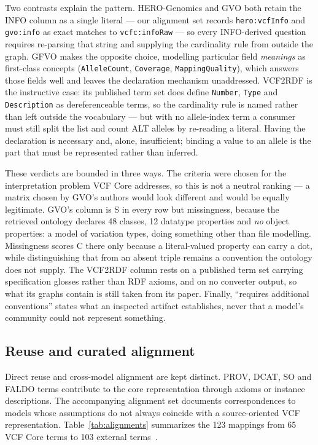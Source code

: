 \documentclass{ceurart}
\newcommand{\term}[1]{\texttt{#1}}
\begin{document}
Two contrasts explain the pattern. 
HERO-Genomics and GVO both retain the INFO column as a single literal --- our alignment set records \term{hero:vcfInfo} and \term{gvo:info} as exact matches to \term{vcfc:infoRaw} --- so every INFO-derived question requires re-parsing that string and supplying the cardinality rule from outside the graph. 
GFVO makes the opposite choice, modelling particular field \emph{meanings} as first-class concepts (\term{AlleleCount}, \term{Coverage}, \term{MappingQuality}), which answers those fields well and leaves the declaration mechanism unaddressed. 
VCF2RDF is the instructive case: its published term set does define \term{Number}, \term{Type} and \term{Description} as dereferenceable terms, so the cardinality rule is named rather than left outside the vocabulary --- but with no allele-index term a consumer must still split the list and count ALT alleles by re-reading a literal. 
Having the declaration is necessary and, alone, insufficient; binding a value to an allele is the part that must be represented rather than inferred.

These verdicts are bounded in three ways. 
The criteria were chosen for the interpretation problem VCF Core addresses, so this is not a neutral ranking --- a matrix chosen by GVO's authors would look different and would be equally legitimate. 
GVO's column is S in every row but missingness, because the retrieved ontology declares 48 classes, 12 datatype properties and \emph{no} object properties: a model of variation types, doing something other than file modelling. 
Missingness scores C there only because a literal-valued property can carry a dot, while distinguishing that from an absent triple remains a convention the ontology does not supply. 
The VCF2RDF column rests on a published term set carrying specification glosses rather than RDF axioms, and on no converter output, so what its graphs contain is still taken from its paper. 
Finally, ``requires additional conventions'' states what an inspected artifact establishes, never that a model's community could not represent something.

\subsection{Reuse and curated alignment}

Direct reuse and cross-model alignment are kept distinct. 
PROV, DCAT, SO and FALDO terms contribute to the core representation through axioms or instance descriptions. 
The accompanying alignment set documents correspondences to models whose assumptions do not always coincide with a source-oriented VCF representation. 
Table~\ref{tab:alignments} summarizes the 123 mappings from 65 VCF Core terms to 103 external terms~\cite{vcfc210}.
\end{document}
